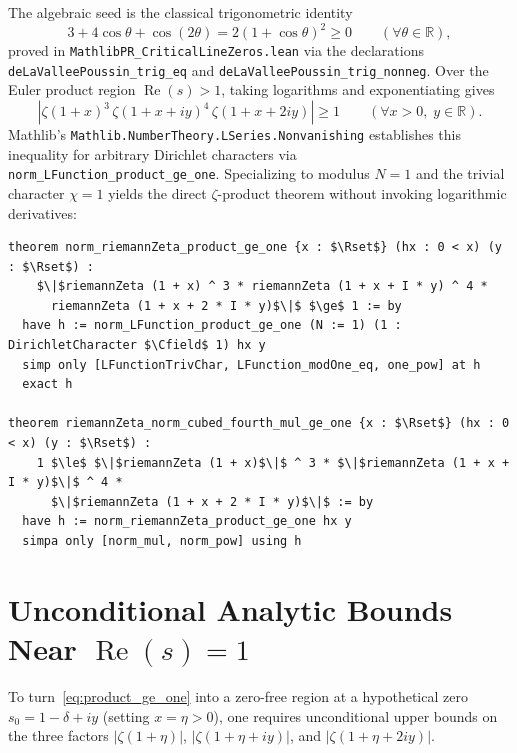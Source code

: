 \documentclass[11pt,a4paper]{article}
\theoremstyle{definition}
\newcommand{\Rset}{\mathbb{R}}
\newcommand{\Cfield}{\mathbb{C}}
\begin{document}
The algebraic seed is the classical trigonometric identity
\begin{equation}\label{eq:trig_identity}
3 + 4\cos\theta + \cos(2\theta) = 2(1 + \cos\theta)^2 \ge 0 \qquad (\forall \theta \in \Rset),
\end{equation}
proved in \texttt{MathlibPR\_\allowbreak CriticalLineZeros.lean} via the declarations \texttt{deLaValleePoussin\_\allowbreak trig\_eq} and \texttt{deLaValleePoussin\_\allowbreak trig\_\allowbreak nonneg}. Over the Euler product region $\operatorname{Re}(s) > 1$, taking logarithms and exponentiating gives
\begin{equation}\label{eq:product_ge_one}
\left|\zeta(1 + x)^3 \, \zeta(1 + x + i y)^4 \, \zeta(1 + x + 2 i y)\right| \ge 1 \qquad (\forall x > 0,\; y \in \Rset).
\end{equation}
Mathlib's \texttt{Mathlib.NumberTheory.LSeries.Nonvanishing} establishes this inequality for arbitrary Dirichlet characters via \texttt{norm\_LFunction\_product\_ge\_one}. Specializing to modulus $N = 1$ and the trivial character $\chi = 1$ yields the direct $\zeta$-product theorem without invoking logarithmic derivatives:
\begin{lstlisting}
theorem norm_riemannZeta_product_ge_one {x : $\Rset$} (hx : 0 < x) (y : $\Rset$) :
    $\|$riemannZeta (1 + x) ^ 3 * riemannZeta (1 + x + I * y) ^ 4 *
      riemannZeta (1 + x + 2 * I * y)$\|$ $\ge$ 1 := by
  have h := norm_LFunction_product_ge_one (N := 1) (1 : DirichletCharacter $\Cfield$ 1) hx y
  simp only [LFunctionTrivChar, LFunction_modOne_eq, one_pow] at h
  exact h

theorem riemannZeta_norm_cubed_fourth_mul_ge_one {x : $\Rset$} (hx : 0 < x) (y : $\Rset$) :
    1 $\le$ $\|$riemannZeta (1 + x)$\|$ ^ 3 * $\|$riemannZeta (1 + x + I * y)$\|$ ^ 4 *
      $\|$riemannZeta (1 + x + 2 * I * y)$\|$ := by
  have h := norm_riemannZeta_product_ge_one hx y
  simpa only [norm_mul, norm_pow] using h
\end{lstlisting}

\section{Unconditional Analytic Bounds Near \texorpdfstring{$\operatorname{Re}(s) = 1$}{Re(s) = 1}}\label{sec:bounds}

To turn~\eqref{eq:product_ge_one} into a zero-free region at a hypothetical zero $s_0 = 1 - \delta + iy$ (setting $x = \eta > 0$), one requires unconditional upper bounds on the three factors $|\zeta(1+\eta)|$, $|\zeta(1+\eta+iy)|$, and $|\zeta(1+\eta+2iy)|$.
\end{document}
